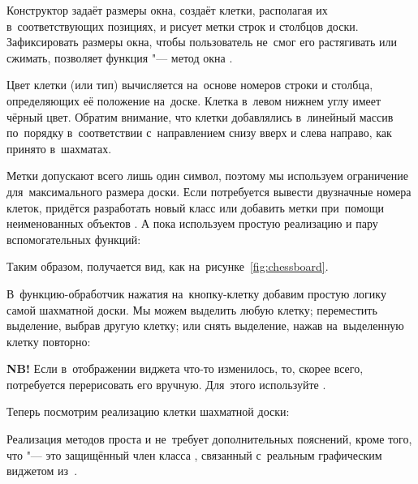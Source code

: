 Конструктор задаёт размеры окна, создаёт клетки, располагая их в~соответствующих позициях, и рисует метки строк и столбцов доски. Зафиксировать размеры окна, чтобы пользователь не~смог его растягивать или сжимать, позволяет функция  "--- метод окна .


Цвет клетки (или тип) вычисляется на~основе номеров строки и столбца, определяющих её положение на~доске. Клетка в~левом нижнем углу имеет чёрный цвет. Обратим внимание, что клетки добавлялись в~линейный массив по~порядку в~соответствии с~направлением снизу вверх и слева направо, как принято в~шахматах.


Метки  допускают всего лишь один символ, поэтому мы используем ограничение  для~максимального размера доски. Если потребуется вывести двузначные номера клеток, придётся разработать новый класс или добавить метки при~помощи неименованных объектов . А пока используем простую реализацию и пару вспомогательных функций:


\noindent Таким образом, получается вид, как на~рисунке~\ref{fig:chessboard}.

В~функцию-обработчик нажатия на~кнопку-клетку добавим простую логику самой шахматной доски. Мы можем выделить любую клетку; переместить выделение, выбрав другую клетку; или снять выделение, нажав на~выделенную клетку повторно:


\noindent\textbf{NB!} Если в~отображении виджета что-то изменилось, то, скорее всего, потребуется перерисовать его вручную. Для~этого используйте .

Теперь посмотрим реализацию клетки шахматной доски:


Реализация методов проста и не~требует дополнительных пояснений, кроме того, что  "--- это защищённый член класса , связанный с~реальным графическим виджетом из~.
\enlargethispage{0.5\baselineskip}


